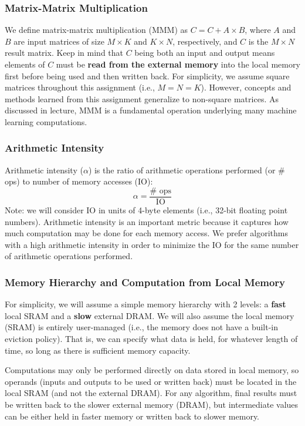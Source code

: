 \documentclass[a4 paper]{article}
\begin{document}
\subsubsection*{Matrix-Matrix Multiplication}
We define matrix-matrix multiplication (MMM) as $C = C + A \times B$, where $A$ and $B$ are input matrices of size $M \times K$ and $K \times N$, respectively, and $C$ is the $M \times N$ result matrix.
Keep in mind that $C$ being both an input and output means elements of $C$ must be \textbf{read from the external memory} into the local memory first before being used and then written back.
For simplicity, we assume square matrices throughout this assignment (i.e., $M = N = K$). 
However, concepts and methods learned from this assignment generalize to non-square matrices.
As discussed in lecture, MMM is a fundamental operation underlying many machine learning computations. 

\subsubsection*{Arithmetic Intensity}
Arithmetic intensity ($\alpha$) is the ratio of arithmetic operations performed (or \# ops) to number of memory accesses (IO):
\[
\alpha = \frac{\#\text{ ops}}{\text{IO}}
\]
Note: we will consider IO in units of 4-byte elements (i.e., 32-bit floating point numbers).
Arithmetic intensity is an important metric because it captures how much computation may be done for each memory access.
We prefer algorithms with a high arithmetic intensity in order to minimize the IO for the same number of arithmetic operations performed.

\subsubsection*{Memory Hierarchy and Computation from Local Memory}
For simplicity, we will assume a simple memory hierarchy with 2 levels: a \textbf{fast} local SRAM and a \textbf{slow} external DRAM.
We will also assume the local memory (SRAM) is entirely user-managed (i.e., the memory does not have a built-in eviction policy).
That is, we can specify what data is held, for whatever length of time, so long as there is sufficient memory capacity.

Computations may only be performed directly on data stored in local memory, so operands (inputs and outputs to be used or written back) must be located in the local SRAM (and not the external DRAM).
For any algorithm, final results must be written back to the slower external memory (DRAM), but intermediate values can be either held in faster memory or written back to slower memory.
\end{document}

